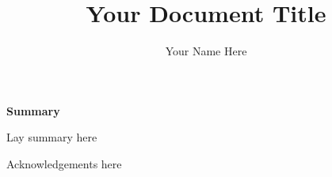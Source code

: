\documentclass[phd,ilcc,oneside,logo]{infthesis}
\title{Your Document Title}
\author{Your Name Here}
\begin{document}
\begin{preliminary}

\maketitle

\cleardoublepage
\begin{center}
\textsf{\textbf{\LARGE Summary}}
\end{center}
Lay summary here

\cleardoublepage

\begin{acknowledgements}
Acknowledgements here
\end{acknowledgements}

\standarddeclaration


\tableofcontents


\end{preliminary}





%





\end{document}
